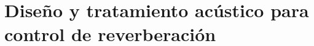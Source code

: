 \section{Diseño y tratamiento acústico para control de reverberación}
\resetallcounters

\clearpage





\pagestyle{bibliostyle}




